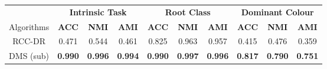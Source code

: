 
\renewcommand{\arraystretch}{1.2}

 


\begin{tabular}{cccccccccc}
\hline
 & \multicolumn{3}{c}{\textbf{Intrinsic Task} } & \multicolumn{3}{c}{\textbf{Root Class} } & \multicolumn{3}{c}{\textbf{Dominant Colour}}\\
 \cmidrule(r){2-4} \cmidrule(r){5-7} \cmidrule(r){8-10} 
Algorithms & \textbf{ACC} & \textbf{NMI} & \textbf{AMI} & \textbf{ACC} & \textbf{NMI} & \textbf{AMI} & \textbf{ACC} & \textbf{NMI} & \textbf{AMI} \\
\hline
RCC-DR & 0.471 & 0.544 & 0.461 & 0.825 & 0.963 & 0.957 & 0.415 & 0.476 & 0.359 \\
DMS (sub) & \textbf{0.990} & \textbf{0.996} & \textbf{0.994} & \textbf{0.990} & \textbf{0.997} & \textbf{0.996} & \textbf{0.817} & \textbf{0.790} & \textbf{0.751} \\ \hline 
\end{tabular}